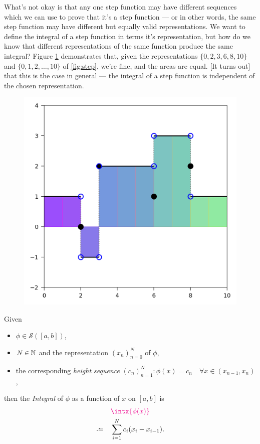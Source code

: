  \medskip
What's not okay is that any one step function may have different sequences which we can use to prove that it's a step function --- or in other words, the same step function may have different but equally valid representations. We want to define the integral of a step function in terms it's representation, but how do we know that different representations of the same function produce the same integral? Figure \ref{fig:stepfilled} demonstrates that, given the representations $\{0, 2, 3, 6, 8, 10\}$ and $\{0, 1, 2, \ldots, 10\}$ of \ref{fig:step}, we're fine, and the areas are equal. [It turns out] that this is the case in general --- the integral of a step function is independent of the chosen representation.

\begin{figure}[h]
  \centering
  \includegraphics{Code/StepFilled2.png}
  \label{fig:stepfilled}
\end{figure}

\begin{definition}\label{def:stint}
	Given
	\begin{itemize}
	\item 
		$\phi \in \mathcal{S}([a, b])$,
	\item
		$N \in \mathbb{N}$ and the representation $(x_n)_{n=0}^N$ of $\phi$,
	\item
		the corresponding \emph{height sequence} $(c_n)_{n=1}^N : \phi(x) = c_n \quad \forall x \in (x_{n-1}, x_{n})$,
	\end{itemize}
	then the {\color{Magenta}\emph{Integral}} of $\phi$ as a function of $x$ on $[a, b]$ is
	\begin{equation}
	\begin{split}
		&{\color{Magenta}\intx{\phi(x)}} \\
		\defeq \quad &\sum_{i=1}^N c_i(x_{i} - x_{i-1}).
	\end{split}
	\end{equation}
\end{definition}%

